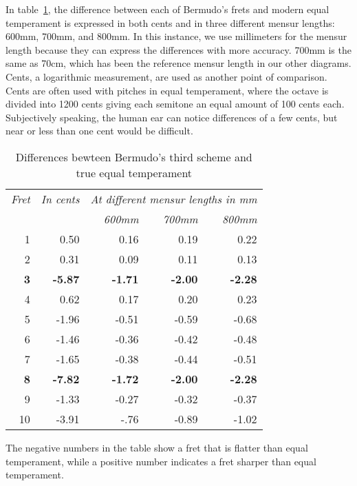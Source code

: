 In table~\ref{bermudo:differences}, the difference between each of Bermudo's frets and
modern equal temperament is expressed in both cents and in three different mensur
lengths: 600mm, 700mm, and 800mm. In this instance, we use millimeters for the mensur length because they
can express the differences with more accuracy. 700mm is the same as 70cm, which
has been the reference mensur length in our other diagrams. Cents, a logarithmic
measurement, are used as another point of comparison. Cents are often used with
pitches in equal temperament, where the octave is divided into 1200 cents giving
each semitone an equal amount of 100 cents each.
Subjectively speaking, the human ear can notice differences of a few cents, but near or
less than one cent would be difficult.
\begin{table}[h!]
  \begin{center}
  \begin{tabular}{ r r| r r r }
   \textit{Fret} & \textit{In cents} & \multicolumn{3}{c}{\textit{At different mensur lengths in mm}} \\
    & & \textit{600mm} & \textit{700mm} & \textit{800mm} \\
   \hline
       1 &     0.50	&     0.16	 &     0.19 &     0.22 \\
       2 &     0.31	&     0.09	 &     0.11 &     0.13 \\
   \textbf{3} & \textbf{-5.87}	& \textbf{-1.71} & \textbf{-2.00} & \textbf{-2.28} \\
       4 &     0.62	&     0.17	 &     0.20 &     0.23 \\
       5 &     -1.96	&     -0.51	 &     -0.59 &     -0.68 \\
       6 &     -1.46	&     -0.36	 &     -0.42 &     -0.48 \\
       7 &     -1.65	&     -0.38	 &     -0.44 &     -0.51 \\
   \textbf{8} & \textbf{-7.82}	& \textbf{-1.72} & \textbf{-2.00} & \textbf{-2.28} \\
       9 &     -1.33	&     -0.27	 &     -0.32 &     -0.37 \\
       10 &     -3.91	&     -.76	 &     -0.89 &     -1.02 \\
  \end{tabular}
  \end{center}
  \caption{Differences bewteen Bermudo's third scheme and true equal temperament}
  \label{bermudo:differences}
\end{table}
The negative numbers in the table show a fret that is flatter than equal temperament,
while a positive number indicates a fret sharper than equal temperament.

